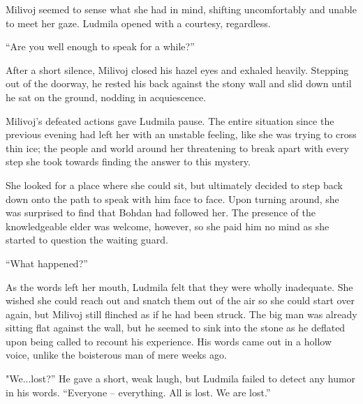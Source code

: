  

Milivoj seemed to sense what she had in mind, shifting uncomfortably and unable to meet her gaze. Ludmila opened with a courtesy, regardless.

 

“Are you well enough to speak for a while?”

 

After a short silence, Milivoj closed his hazel eyes and exhaled heavily. Stepping out of the doorway, he rested his back against the stony wall and slid down until he sat on the ground, nodding in acquiescence.

 

Milivoj’s defeated actions gave Ludmila pause. The entire situation since the previous evening had left her with an unstable feeling, like she was trying to cross thin ice; the people and world around her threatening to break apart with every step she took towards finding the answer to this mystery.

 

She looked for a place where she could sit, but ultimately decided to step back down onto the path to speak with him face to face. Upon turning around, she was surprised to find that Bohdan had followed her. The presence of the knowledgeable elder was welcome, however, so she paid him no mind as she started to question the waiting guard.

 

“What happened?”

 

As the words left her mouth, Ludmila felt that they were wholly inadequate. She wished she could reach out and snatch them out of the air so she could start over again, but Milivoj still flinched as if he had been struck. The big man was already sitting flat against the wall, but he seemed to sink into the stone as he deflated upon being called to recount his experience. His words came out in a hollow voice, unlike the boisterous man of mere weeks ago.

 

"We...lost?” He gave a short, weak laugh, but Ludmila failed to detect any humor in his words. “Everyone – everything. All is lost. We are lost.”